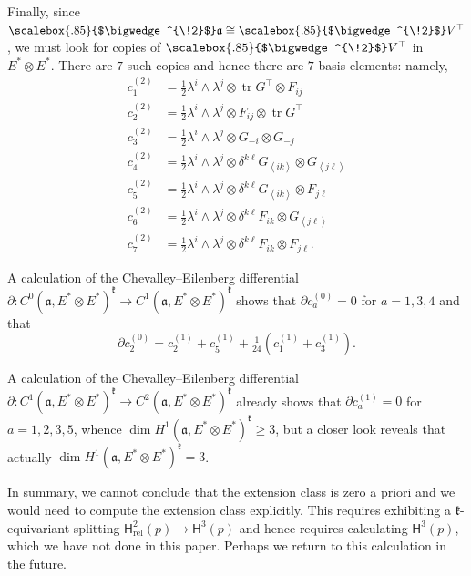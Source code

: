 \documentclass[11pt,reqno,a4paper,final]{amsart}
\newcommand\ext[1]{\scalebox{.85}{$\bigwedge^{\!#1}$}}
\theoremstyle{plain}
\theoremstyle{definition}
\newcommand{\fa}{\mathfrak{a}}
\newcommand{\fk}{\mathfrak{k}}
\renewcommand{\d}{\partial}
\newcommand{\sH}{\mathsf{H}}
\newcommand{\Hrel}{\mathsf{H}_{\mathrm{rel}}}
\newcommand{\tr}{\operatorname{tr}}
\newcommand{\1}{\mathbb{1}}
\numberwithin{equation}{section}
\begin{document}
\begin{appendices}
Finally, since $\ext{2}\fa \cong \ext{2}V^\top$, we must look for
copies of $\ext{2}V^\top$ in $E^* \otimes E^*$.  There are $7$ such
copies and hence there are $7$ basis elements: namely,
\begin{equation}
  \begin{split}
    c^{(2)}_1 &= \tfrac12 \lambda^i \wedge \lambda^j \otimes \tr G^\top \otimes F_{ij}\\
    c^{(2)}_2 &= \tfrac12 \lambda^i \wedge \lambda^j \otimes F_{ij} \otimes \tr G^\top\\
    c^{(2)}_3 &= \tfrac12 \lambda^i \wedge \lambda^j \otimes G_{-i} \otimes G_{-j} \\
    c^{(2)}_4 &= \tfrac12 \lambda^i \wedge \lambda^j \otimes  \delta^{k\ell} G_{\left<ik\right>} \otimes  G_{\left<j\ell\right>}\\
    c^{(2)}_5 &= \tfrac12 \lambda^i \wedge \lambda^j \otimes  \delta^{k\ell} G_{\left<ik\right>} \otimes  F_{j\ell}\\
    c^{(2)}_6 &= \tfrac12 \lambda^i \wedge \lambda^j \otimes \delta^{k\ell} F_{ik} \otimes  G_{\left<j\ell\right>}\\
    c^{(2)}_7 &= \tfrac12 \lambda^i \wedge \lambda^j \otimes \delta^{k\ell} F_{ik} \otimes  F_{j\ell}.
  \end{split}
\end{equation}

A calculation of the Chevalley--Eilenberg differential $\d \colon
C^0(\fa,E^* \otimes E^*)^{\fk}\to C^1(\fa,E^* \otimes E^*)^{\fk}$
shows that $\d c^{(0)}_a = 0$ for $a =1,3,4$ and that
\begin{equation}
  \d c^{(0)}_2 = c^{(1)}_2 + c^{(1)}_5 + \tfrac 1{24} \left( c^{(1)}_1 + c^{(1)}_3 \right).
\end{equation}

A calculation of the Chevalley--Eilenberg differential
$\d \colon C^1(\fa,E^* \otimes E^*)^{\fk}\to C^2(\fa,E^* \otimes
E^*)^{\fk}$ already shows that $\d c^{(1)}_a = 0$ for $a =1,2,3,5$,
whence $\dim H^1(\fa,E^* \otimes E^*)^{\fk} \geq 3$, but a closer look
reveals that actually $\dim H^1(\fa,E^* \otimes E^*)^{\fk} = 3$.

In summary, we cannot conclude that the extension class is zero a priori and
we would need to compute the extension class explicitly. This requires
exhibiting a $\fk$-equivariant splitting $\Hrel^2(p) \to \sH^3(p)$ and
hence requires calculating $\sH^3(p)$, which we have not done in this
paper.  Perhaps we return to this calculation in the future.

\end{appendices}




\end{document}
